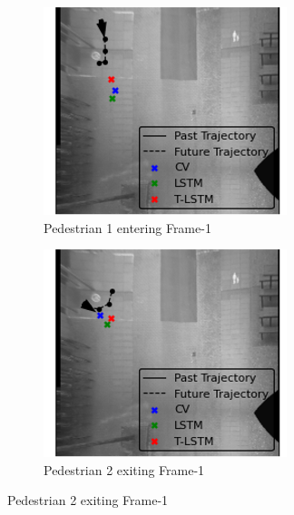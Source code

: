 \documentclass{article}
\begin{document}
\begin{figure}[H]
\centering
\begin{subfigure}{0.4\textwidth}
  \centering
  \includegraphics[width=\linewidth]{quali_results/ped-entry.png}
  \caption{Pedestrian 1 entering Frame-1}
  \label{fig:ped-entry}
\end{subfigure}
\begin{subfigure}{0.4\textwidth}
  \centering
  \includegraphics[width=\linewidth]{quali_results/ped-exit.png}
  \caption{Pedestrian 2 exiting Frame-1}

\end{subfigure}
\end{figure}
\end{document}
